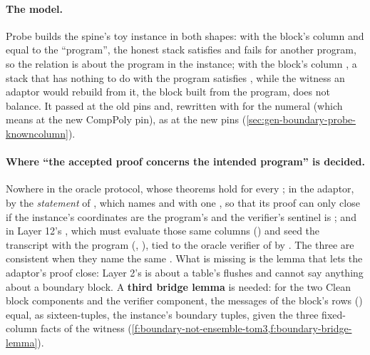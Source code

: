 \paragraph{The model.} Probe  builds the spine's toy instance in both shapes:
with the block's column  and equal to the \enquote{program}, the honest stack
satisfies  and fails  for another program, so the relation is about
the program in the instance; with the block's column , a stack that has nothing
to do with the program satisfies , while the witness an adaptor would rebuild from
it, the block built from the program, does not balance. It passed at the old pins and, rewritten
with  for the numeral  (which means  at the new CompPoly pin), as
 at the new pins (\cref{sec:gen-boundary-probe-knowncolumn}).

\paragraph{Where \enquote{the accepted proof concerns the intended program} is decided.}
Nowhere in the oracle protocol, whose theorems hold for every ; in the adaptor, by the
\emph{statement} of , which names  and
 with one , so that its proof can only close if the instance's
 coordinates are the program's and the verifier's sentinel is ;
and in Layer 12's , which must evaluate those same 
columns () and seed the transcript with the program (,
), tied to the oracle verifier of  by
. The three are consistent when they name the same . What is
missing is the lemma that lets the adaptor's proof close: Layer 2's  is
about a table's flushes and cannot say anything about a boundary block. A \textbf{third bridge
lemma} is needed: for the two Clean block components and the verifier component, the messages of
the block's rows () equal, as sixteen-tuples, the
instance's boundary tuples, given the three fixed-column facts of the witness
(\cref{f:boundary-not-ensemble-tom3,f:boundary-bridge-lemma}).


